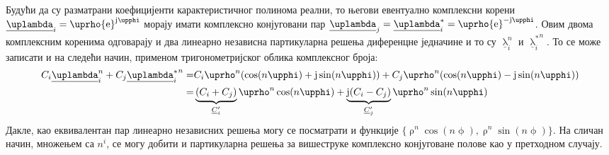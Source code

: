 Будући да су разматрани коефицијенти карактеристичног
полинома реални, то његови евентуално комплексни корени  
$\underline{\uplambda}_i = \uprho {\rm e}^{{\rm j}\upphi}$ морају имати комплексно 
конјуговани пар $\underline{\uplambda}_j=\underline{\uplambda}_i^* 
= \uprho {\rm e}^{-{\rm j}\upphi}$. Овим двома 
комплексним коренима одговарају и два линеарно независна
партикуларна решења диференцне једначине и то су 
$\underline{\uplambda}_i^n$ и 
${\underline{\uplambda}_i^*}^n$. То се 
може записати и на следећи начин, применом тригонометријског облика комплексног 
броја:
\begin{align}
C_i \underline{\uplambda}_i^n
+ C_j {\underline{\uplambda}_i^*}^n =& 
C_i \uprho^n(\cos(n\upphi) + 
{\rm j}\sin(n\upphi)) 
+ C_j \uprho^n(\cos(n\upphi) - 
{\rm j}\sin(n\upphi)) \\
=& \underbrace{(C_i + C_j)}_{\underline C_i'} \uprho^n \cos(n\upphi) + 
\underbrace{ {\rm j}(C_i - C_j)}_{\underline C_j'}\uprho^n \sin(n\upphi) \label{recttrig}
\end{align}
Дакле, као еквивалентан пар линеарно независних 
решења могу се посматрати и функције 
$\{\uprho^n \cos(n\upphi), 
\uprho^n \sin(n\upphi)\}$. На сличан начин, 
множењем са $n^i$, се 
могу добити и партикуларна решења за вишеструке 
комплексно конјуговане полове као у претходном случају.


